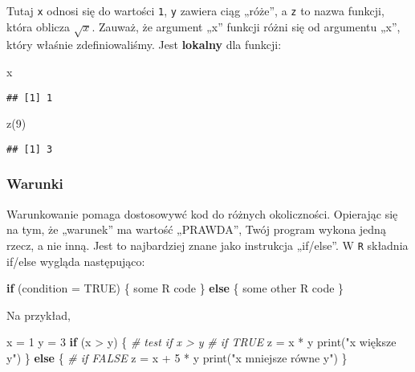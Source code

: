 \documentclass[
]{article}
\newenvironment{Shaded}{\begin{snugshade}}{\end{snugshade}}
\newcommand{\AttributeTok}[1]{\textcolor[rgb]{0.77,0.63,0.00}{#1}}
\newcommand{\CommentTok}[1]{\textcolor[rgb]{0.56,0.35,0.01}{\textit{#1}}}
\newcommand{\ConstantTok}[1]{\textcolor[rgb]{0.00,0.00,0.00}{#1}}
\newcommand{\ControlFlowTok}[1]{\textcolor[rgb]{0.13,0.29,0.53}{\textbf{#1}}}
\newcommand{\DecValTok}[1]{\textcolor[rgb]{0.00,0.00,0.81}{#1}}
\newcommand{\FunctionTok}[1]{\textcolor[rgb]{0.00,0.00,0.00}{#1}}
\newcommand{\NormalTok}[1]{#1}
\newcommand{\OtherTok}[1]{\textcolor[rgb]{0.56,0.35,0.01}{#1}}
\newcommand{\SpecialCharTok}[1]{\textcolor[rgb]{0.00,0.00,0.00}{#1}}
\newcommand{\StringTok}[1]{\textcolor[rgb]{0.31,0.60,0.02}{#1}}
\begin{document}
Tutaj \texttt{x} odnosi się do wartości \texttt{1}, \texttt{y} zawiera
ciąg „róże'', a \texttt{z} to nazwa funkcji, która oblicza \(\sqrt{x}\).
Zauważ, że argument „x'' funkcji różni się od argumentu „x'', który
właśnie zdefiniowaliśmy. Jest \textbf{lokalny} dla funkcji:

\begin{Shaded}
\begin{Highlighting}[]
\NormalTok{x}
\end{Highlighting}
\end{Shaded}

\begin{verbatim}
## [1] 1
\end{verbatim}

\begin{Shaded}
\begin{Highlighting}[]
\FunctionTok{z}\NormalTok{(}\DecValTok{9}\NormalTok{)}
\end{Highlighting}
\end{Shaded}

\begin{verbatim}
## [1] 3
\end{verbatim}

\hypertarget{warunki}{%
\subsubsection{Warunki}\label{warunki}}

Warunkowanie pomaga dostosowywć kod do różnych okoliczności. Opierając
się na tym, że „warunek'' ma wartość „PRAWDA'', Twój program wykona
jedną rzecz, a nie inną. Jest to najbardziej znane jako instrukcja
„if/else''. W \texttt{R} składnia if/else wygląda następująco:

\begin{Shaded}
\begin{Highlighting}[]
\ControlFlowTok{if}\NormalTok{ (}\AttributeTok{condition =} \ConstantTok{TRUE}\NormalTok{) \{}
\NormalTok{  some R code}
\NormalTok{\} }\ControlFlowTok{else}\NormalTok{ \{}
\NormalTok{  some other R code}
\NormalTok{\}}
\end{Highlighting}
\end{Shaded}

Na przykład,

\begin{Shaded}
\begin{Highlighting}[]
\NormalTok{x }\OtherTok{=} \DecValTok{1}
\NormalTok{y }\OtherTok{=} \DecValTok{3}
\ControlFlowTok{if}\NormalTok{ (x }\SpecialCharTok{\textgreater{}}\NormalTok{ y) \{  }\CommentTok{\# test if x \textgreater{} y}
  \CommentTok{\# if TRUE}
\NormalTok{  z }\OtherTok{=}\NormalTok{ x }\SpecialCharTok{*}\NormalTok{ y}
  \FunctionTok{print}\NormalTok{(}\StringTok{"x większe y"}\NormalTok{)}
\NormalTok{\} }\ControlFlowTok{else}\NormalTok{ \{}
  \CommentTok{\# if FALSE}
\NormalTok{  z }\OtherTok{=}\NormalTok{ x }\SpecialCharTok{+} \DecValTok{5} \SpecialCharTok{*}\NormalTok{ y}
  \FunctionTok{print}\NormalTok{(}\StringTok{"x mniejsze równe y"}\NormalTok{)}
\NormalTok{\}}
\end{Highlighting}
\end{Shaded}
\end{document}
